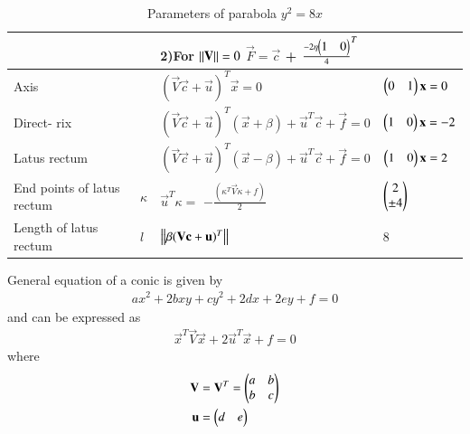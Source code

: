 \documentclass[journal,12pt,twocolumn]{IEEEtran}
\begin{document}
\begin{table}[!ht]
\begin{center}
\begin{tabular}{ | m{1.25cm} | m{0.8cm}| m{2.7cm} | m{2.35cm} | }
& & 2)For $\left\lVert\mathbf{V}\right\rVert=0$ \newline $\vec{F}= \vec{c}$  + \newline ${\frac{-2\eta\begin{pmatrix}1 & 0\end{pmatrix}}{4}}^{T}$\newline &
\\
\hline
Axis &  & $(\vec{V}\vec{c}+\vec{u})^{T}\vec{x} = 0$  & $\begin{pmatrix}0 & 1\end{pmatrix}\mathbf{x}=0$ \\
\hline
Direct- \newline rix &  & $(\vec{V}\vec{c}+\vec{u})^T(\vec{x} +\beta) + \vec{u}^T\vec{c} + \vec{f} = 0$ \newline  &$\begin{pmatrix}1 & 0\end{pmatrix}\mathbf{x}=-2$\\
\hline
Latus \newline rectum & & $(\vec{V}\vec{c}+\vec{u})^T(\vec{x} -\beta) + \vec{u}^T\vec{c} + \vec{f} = 0$ & $\begin{pmatrix}1 & 0\end{pmatrix}\mathbf{x} = 2$ \\
\hline
End \newline points \newline of latus \newline rectum & $\kappa$ & $\vec{u}^T\kappa =$ \newline $-\frac{(\kappa^T\vec{V}\kappa + f )}{2}$ & $\begin{pmatrix}2 \\ \pm 4\end{pmatrix}$  \\
\hline
Length \newline of latus \newline rectum & $l$ & $\left\lVert\beta(\mathbf{V}\mathbf{c}+\mathbf{u})^T\right\rVert$ & 8  \\
\hline
\end{tabular}
\end{center}
\caption{Parameters of parabola $y^2=8x$}
\label{tab:table1}
\end{table}

\begin{lemma}
General equation of a conic is given by
\begin{align}
ax^2+2bxy+cy^2+2dx+2ey+f=0 \label{eq:geneq}
\end{align}
and can be expressed as 
\begin{align}
    \vec{x}^T\vec{V}\vec{x} + 2\vec{u}^T\vec{x} + f = 0 \label{eq:veceq}
\end{align}
where
\begin{align}
    \mathbf{V}&=\mathbf{V}^T=\begin{pmatrix}a & b\\b & c\end{pmatrix}
    \\
    \mathbf{u}&=\begin{pmatrix}d & e\end{pmatrix}
\end{align}
\end{lemma}
\end{document}
